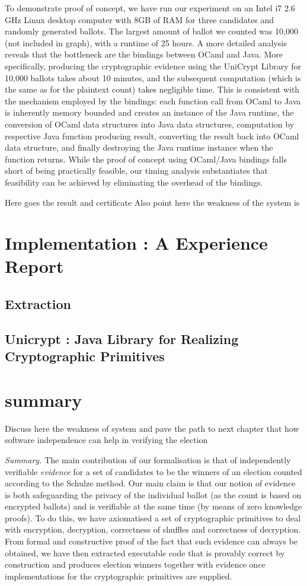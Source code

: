 To demonstrate proof of concept, 
we have run our experiment on an  Intel  i7  2.6  GHz  Linux  desktop  computer
with  8GB  of  RAM for three candidates and randomly generated ballots. The 
largest  amount of ballot we counted was 10,000 (not included in
graph), with a runtime of 25 hours. A more detailed analysis reveals
that the bottleneck are the bindings between OCaml and Java. More
specifically, producing the cryptographic evidence using the
UniCrypt Library for 10,000 ballots takes about 10 minutes, and the
subsequent computation (which is the same as for the plaintext
count) takes negligible time. This is consistent with the mechanism
employed by the bindings:
each function call from OCaml to Java is inherently memory bounded
and creates an instance of the Java runtime, 
the conversion of OCaml data structures into Java data
structures, 
computation by respective Java function producing result,
converting the result back into OCaml data structure, and finally destroying 
the Java runtime instance when the function returns. While the proof
of concept using OCaml/Java bindings falls short of being
practically feasible, our timing analysis substantiates that
feasibility can be achieved by eliminating the overhead of the
bindings. 

  Here goes the result and certificate
  Also point here the weakness of the system is
  
\section{Implementation : A Experience Report}
  \subsection{Extraction}
  \subsection{Unicrypt : Java Library for Realizing Cryptographic Primitives}  
\section{summary}
  Discuss here the weakness of system and pave the path to next chapter
  that how software independence can help in verifying the election
  
  \noindent\emph{Summary.} The main contribution of our formalisation is that of independently
verifiable \emph{evidence} for a set of candidates to be the winners
of an election counted according to the Schulze method. Our main
claim is that our notion of evidence is both safeguarding the
privacy of the individual ballot (as the count is based on encrypted
ballots) and is verifiable at the same time (by means of zero
knowledge proofs). To do this, we have axiomatised a set of
cryptographic primitives to deal with encryption, decryption,
correctness of shuffles and correctness of decryption. From formal
and constructive proof of the fact that such evidence can always be
obtained, we have then extracted executable code that is provably
correct by construction and produces election winners together with
evidence once implementations for the cryptographic primitives are
supplied.

